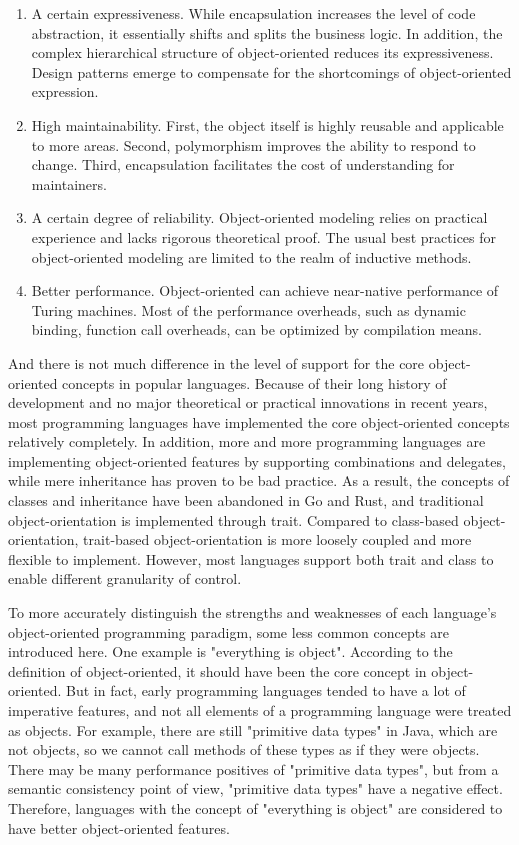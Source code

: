 \begin{enumerate}
    \item A certain expressiveness. While encapsulation increases the level of code abstraction, it essentially shifts and splits the business logic. In addition, the complex hierarchical structure of object-oriented reduces its expressiveness. Design patterns emerge to compensate for the shortcomings of object-oriented expression.
    \item High maintainability. First, the object itself is highly reusable and applicable to more areas. Second, polymorphism improves the ability to respond to change. Third, encapsulation facilitates the cost of understanding for maintainers.
    \item A certain degree of reliability. Object-oriented modeling relies on practical experience and lacks rigorous theoretical proof. The usual best practices for object-oriented modeling are limited to the realm of inductive methods.
    \item Better performance. Object-oriented can achieve near-native performance of Turing machines. Most of the performance overheads, such as dynamic binding, function call overheads, can be optimized by compilation means.
\end{enumerate}


And there is not much difference in the level of support for the core object-oriented concepts in popular languages. Because of their long history of development and no major theoretical or practical innovations in recent years, most programming languages have implemented the core object-oriented concepts relatively completely. In addition, more and more programming languages are implementing object-oriented features by supporting combinations and delegates, while mere inheritance has proven to be bad practice. As a result, the concepts of classes and inheritance have been abandoned in Go and Rust, and traditional object-orientation is implemented through trait. Compared to class-based object-orientation, trait-based object-orientation is more loosely coupled and more flexible to implement. However, most languages support both trait and class to enable different granularity of control.

To more accurately distinguish the strengths and weaknesses of each language's object-oriented programming paradigm, some less common concepts are introduced here. One example is "everything is object". According to the definition of object-oriented, it should have been the core concept in object-oriented. But in fact, early programming languages tended to have a lot of imperative features, and not all elements of a programming language were treated as objects. For example, there are still "primitive data types" in Java, which are not objects, so we cannot call methods of these types as if they were objects. There may be many performance positives of "primitive data types", but from a semantic consistency point of view, "primitive data types" have a negative effect. Therefore, languages with the concept of "everything is object" are considered to have better object-oriented features.

